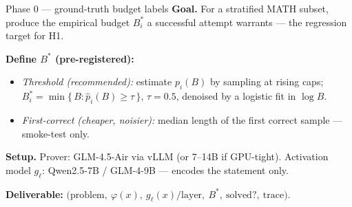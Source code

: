 \documentclass[aspectratio=169,12pt,t,compress]{beamer}
\begin{document}
\begin{frame}{Phase 0 --- ground-truth budget labels}
	\textbf{Goal.} For a stratified MATH subset, produce the empirical budget
	$B^*_i$ a successful attempt warrants --- the regression target for H1.

	\vspace{0.4em}
	\textbf{Define $B^*$ (pre-registered):}
	\begin{itemize}\small
		\item \emph{Threshold (recommended):} estimate $p_i(B)$ by sampling at
		      rising caps; $B^*_i = \min\{\, B : \hat{p}_i(B) \ge \tau \,\}$,
		      $\tau = 0.5$, denoised by a logistic fit in $\log B$.
		\item \emph{First-correct (cheaper, noisier):} median length of the first
		      correct sample --- smoke-test only.
	\end{itemize}

	\vspace{0.3em}
	\textbf{Setup.} Prover: GLM-4.5-Air via vLLM (or 7--14B if GPU-tight).
	Activation model $g_\ell$: Qwen2.5-7B / GLM-4-9B --- encodes the statement only.

	\vspace{0.2em}
	\footnotesize\textbf{Deliverable:} $\bigl(\text{problem},\ \varphi(x),\ g_\ell(x)\text{/layer},\ B^*,\ \text{solved?},\ \text{trace}\bigr)$.
\end{frame}
\end{document}
